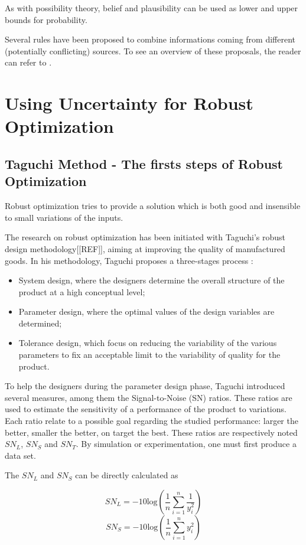 As with possibility theory, belief and plausibility can be used as lower and upper bounds for probability.

Several rules have been proposed to combine informations coming from different (potentially conflicting) sources. To see an overview of these proposals, the reader can refer to \cite{sentz2002combination}.

\section{Using Uncertainty for Robust Optimization}

\subsection{Taguchi Method - The firsts steps of Robust Optimization }

Robust optimization tries to provide a solution which is both good and insensible to small variations of the inputs.

The research on robust optimization has been initiated with Taguchi's robust design methodology[[REF]], aiming at improving the quality of manufactured goods.
In his methodology, Taguchi proposes a three-stages process :
\begin{itemize}
\item System design, where the designers determine the overall structure of the product at a high conceptual level;
\item Parameter design, where the optimal values of the design variables are determined;
\item Tolerance design, which focus on reducing the variability of the  various parameters to fix an acceptable limit to the variability of quality for the product.
\end{itemize}

To help the designers during the parameter design phase, Taguchi introduced several measures, among them the Signal-to-Noise (SN) ratios. These ratios are used to estimate the sensitivity of a performance of the product to variations. Each ratio relate to a possible goal regarding the studied performance: larger the better, smaller the better, on target the best. These ratios are respectively noted $SN_L$, $SN_S$ and $SN_T$.
By simulation or experimentation, one must first produce a data set.

The $SN_L$ and $SN_S$ can be directly calculated as

\[SN_L = -10\text{log}\left( \frac{1}{n} \sum_{i=1}^n \frac{1}{y_i^2} \right)\]
\[SN_S = -10\text{log}\left( \frac{1}{n} \sum_{i=1}^n y_i^2 \right)\]

